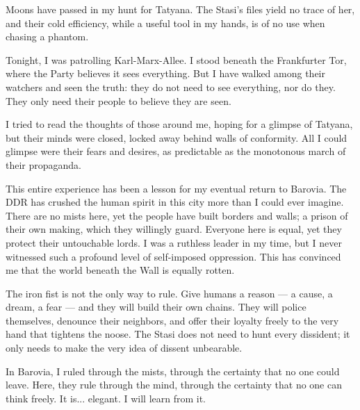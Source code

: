 
Moons have passed in my hunt for Tatyana.
The Stasi's files yield no trace of her, and their cold efficiency, while a useful tool in my hands, is of no use when chasing a phantom.

Tonight, I was patrolling Karl-Marx-Allee.
I stood beneath the Frankfurter Tor, where the Party believes it sees everything.
But I have walked among their watchers and seen the truth: they do not need to see everything, nor do they.
They only need their people to believe they are seen.

I tried to read the thoughts of those around me, hoping for a glimpse of Tatyana, but their minds were closed, locked away behind walls of conformity.
All I could glimpse were their fears and desires, as predictable as the monotonous march of their propaganda.

This entire experience has been a lesson for my eventual return to Barovia.
The DDR has crushed the human spirit in this city more than I could ever imagine.
There are no mists here, yet the people have built borders and walls; a prison of their own making, which they willingly guard.
Everyone here is equal, yet they protect their untouchable lords.
I was a ruthless leader in my time, but I never witnessed such a profound level of self-imposed oppression.
This has convinced me that the world beneath the Wall is equally rotten.

The iron fist is not the only way to rule.
Give humans a reason — a cause, a dream, a fear — and they will build their own chains.
They will police themselves, denounce their neighbors, and offer their loyalty freely to the very hand that tightens the noose.
The Stasi does not need to hunt every dissident; it only needs to make the very idea of dissent unbearable.

In Barovia, I ruled through the mists, through the certainty that no one could leave.
Here, they rule through the mind, through the certainty that no one can think freely.
It is... elegant.
I will learn from it.
\vfill\newpage
